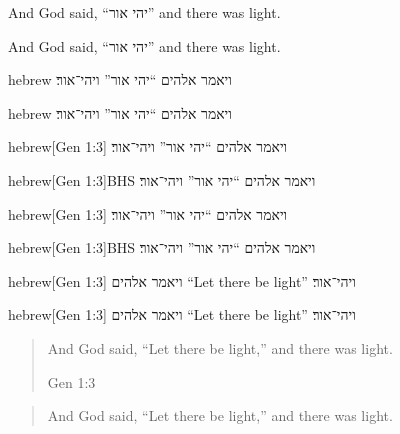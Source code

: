 \documentclass[12pt]{article}
\begin{document}
\begin{displayquote}[Gen 1:3]
  And God said, \foreignquote{hebrew}{יהי אור} and there was light.
\end{displayquote}

\begin{displayquote}[Gen 1:3]
  And God said, \hyphenquote{hebrew}{יהי אור} and there was light.
\end{displayquote}

\begin{foreigndisplayquote}{hebrew}
  ויאמר אלהים \enquote{יהי אור} ויהי־אור׃
\end{foreigndisplayquote}

\begin{hyphendisplayquote}{hebrew}
  ויאמר אלהים \enquote{יהי אור} ויהי־אור׃
\end{hyphendisplayquote}

\begin{foreigndisplayquote}{hebrew}[Gen 1:3]
  ויאמר אלהים \enquote{יהי אור} ויהי־אור׃
\end{foreigndisplayquote}

\begin{foreigndisplaycquote}{hebrew}[Gen 1:3]{BHS}
  ויאמר אלהים \enquote{יהי אור} ויהי־אור׃
\end{foreigndisplaycquote}

\begin{hyphendisplayquote}{hebrew}[Gen 1:3]
  ויאמר אלהים \enquote{יהי אור} ויהי־אור׃
\end{hyphendisplayquote}

\begin{hyphendisplaycquote}{hebrew}[Gen 1:3]{BHS}
  ויאמר אלהים \enquote{יהי אור} ויהי־אור׃
\end{hyphendisplaycquote}

\begin{foreigndisplayquote}{hebrew}[Gen 1:3]
  ויאמר אלהים \foreignquote{english}{Let there be light} ויהי־אור׃
\end{foreigndisplayquote}

\begin{hyphendisplayquote}{hebrew}[Gen 1:3]
  ויאמר אלהים \foreignquote{english}{Let there be light} ויהי־אור׃
\end{hyphendisplayquote}

\blockquote[Gen 1:3]{And God said, \enquote{Let there be light,} and there was
light.}

\blockcquote[Gen 1:3]{BHS}{And God said, \enquote{Let there be light,} and
there was light.}
\end{document}
